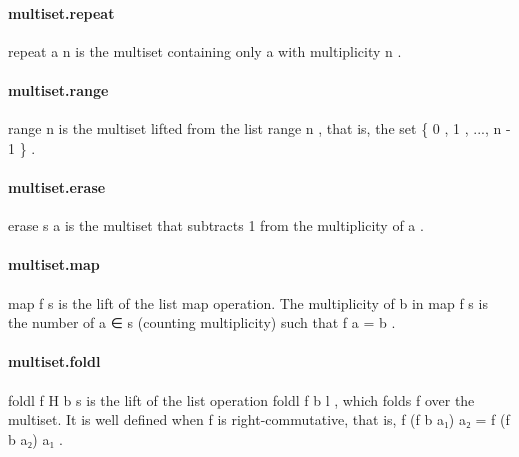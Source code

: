 \documentclass{article}
\begin{document}
\paragraph{multiset.repeat}
\par
\colorbox[RGB]{253,246,227}{{{{\color[RGB]{101, 123, 131} repeat a n }}}} is the multiset containing only 
\colorbox[RGB]{253,246,227}{{{{\color[RGB]{101, 123, 131} a }}}} with multiplicity 
\colorbox[RGB]{253,246,227}{{{{\color[RGB]{101, 123, 131} n }}}}.
\paragraph{multiset.range}
\par
\colorbox[RGB]{253,246,227}{{{{\color[RGB]{101, 123, 131} range n }}}} is the multiset lifted from the list 
\colorbox[RGB]{253,246,227}{{{{\color[RGB]{101, 123, 131} range n }}}},
that is, the set 
\colorbox[RGB]{253,246,227}{{{{\color[RGB]{101, 123, 131} \{ }}}{{{\color[RGB]{108, 113, 196} 0 }}}{{{\color[RGB]{101, 123, 131} ,  }}}{{{\color[RGB]{108, 113, 196} 1 }}}{{{\color[RGB]{101, 123, 131} , ..., n }}}{{{\color[RGB]{181, 137, 0} - }}}{{{\color[RGB]{108, 113, 196} 1 }}}{{{\color[RGB]{101, 123, 131} \} }}}}.
\paragraph{multiset.erase}
\par
\colorbox[RGB]{253,246,227}{{{{\color[RGB]{101, 123, 131} erase s a }}}} is the multiset that subtracts 1 from the
multiplicity of 
\colorbox[RGB]{253,246,227}{{{{\color[RGB]{101, 123, 131} a }}}}.
\paragraph{multiset.map}
\par
\colorbox[RGB]{253,246,227}{{{{\color[RGB]{101, 123, 131} map f s }}}} is the lift of the list 
\colorbox[RGB]{253,246,227}{{{{\color[RGB]{101, 123, 131} map }}}} operation. The multiplicity
of 
\colorbox[RGB]{253,246,227}{{{{\color[RGB]{101, 123, 131} b }}}} in 
\colorbox[RGB]{253,246,227}{{{{\color[RGB]{101, 123, 131} map f s }}}} is the number of 
\colorbox[RGB]{253,246,227}{{{{\color[RGB]{101, 123, 131} a ∈ s }}}} (counting multiplicity)
such that 
\colorbox[RGB]{253,246,227}{{{{\color[RGB]{101, 123, 131} f a  }}}{{{\color[RGB]{181, 137, 0} = }}}{{{\color[RGB]{101, 123, 131}  b }}}}.
\paragraph{multiset.foldl}
\par
\colorbox[RGB]{253,246,227}{{{{\color[RGB]{101, 123, 131} foldl f H b s }}}} is the lift of the list operation 
\colorbox[RGB]{253,246,227}{{{{\color[RGB]{101, 123, 131} foldl f b l }}}},
which folds 
\colorbox[RGB]{253,246,227}{{{{\color[RGB]{101, 123, 131} f }}}} over the multiset. It is well defined when 
\colorbox[RGB]{253,246,227}{{{{\color[RGB]{101, 123, 131} f }}}} is right-commutative,
that is, 
\colorbox[RGB]{253,246,227}{{{{\color[RGB]{101, 123, 131} f (f b a₁) a₂  }}}{{{\color[RGB]{181, 137, 0} = }}}{{{\color[RGB]{101, 123, 131}  f (f b a₂) a₁ }}}}.
\end{document}
